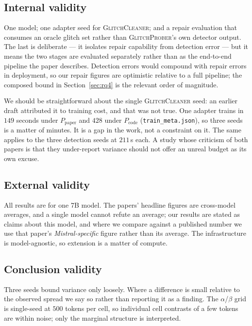 \documentclass[11pt,a4paper]{article}
\newcommand{\gp}{\textsc{GlitchProber}}
\newcommand{\gc}{\textsc{GlitchCleaner}}
\newcommand{\Ppaper}{$P_{\mathrm{paper}}$}
\newcommand{\Pcode}{$P_{\mathrm{code}}$}
\begin{document}
\subsection{Internal validity}

One model; one adapter seed for \gc{}; and a repair evaluation that consumes an
oracle glitch set rather than \gp{}'s own detector output. The last is deliberate
--- it isolates repair capability from detection error --- but it means the two
stages are evaluated separately rather than as the end-to-end pipeline the paper
describes. Detection errors would compound with repair errors in deployment, so
our repair figures are optimistic relative to a full pipeline; the composed bound
in Section~\ref{sec:rq4} is the relevant order of magnitude.

We should be straightforward about the single \gc{} seed: an earlier draft
attributed it to training cost, and that was not true. One adapter trains in
$149$ seconds under \Ppaper{} and $428$ under \Pcode{}
(\texttt{train\_meta.json}), so three seeds is a matter of minutes. It is a gap in
the work, not a constraint on it. The same applies to the three detection seeds at
$211$\,s each. A study whose criticism of both papers is that they under-report
variance should not offer an unreal budget as its own excuse.

\subsection{External validity}

All results are for one 7B model. The papers' headline figures are cross-model
averages, and a single model cannot refute an average; our results are stated as
claims about this model, and where we compare against a published number we use
that paper's \emph{Mistral-specific} figure rather than its average. The
infrastructure is model-agnostic, so extension is a matter of compute.

\subsection{Conclusion validity}

Three seeds bound variance only loosely. Where a difference is small relative to
the observed spread we say so rather than reporting it as a finding. The
$\alpha$/$\beta$ grid is single-seed at $500$ tokens per cell, so individual cell
contrasts of a few tokens are within noise; only the marginal structure is
interpreted.
\end{document}
